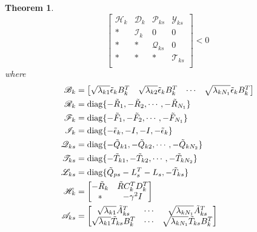\documentclass[conference]{IEEEtran}
\newtheorem{theorem}{Theorem}
\begin{document}
\begin{theorem}
	\begin{equation}\label{T3C3}
		\begin{bmatrix}
			\mathscr{H}_{k}&\mathscr{D}_{k}&\mathscr{P}_{ks}&\mathscr{Y}_{ks}\\
			*&\mathscr{I}_{k}&0&0\\
			*&*&\mathscr{Q}_{ks}&0\\
			*&*&*&\mathscr{T}_{ks}\\
		\end{bmatrix} <0
	\end{equation}
	where 
	\begin{equation}\notag
		\begin{split}
			\mathscr{B}_{k}&= \begin{bmatrix}
				\sqrt{\lambda_{k1}}\tilde{\epsilon}_{k}B^{T}_{k}&\sqrt{\lambda_{k2}}\tilde{\epsilon}_{k}B^{T}_{k}&\cdots&\sqrt{\lambda_{kN_{1}}}\tilde{\epsilon}_{k}B^{T}_{k}
			\end{bmatrix}\\
			\mathscr{R}_{k}&= \mathrm{diag}\{-\tilde{R}_{1}, -\tilde{R}_{2}, \cdots, -\tilde{R}_{N_{1}} \} \\
			\mathscr{F}_{k}&= \mathrm{diag}\{-\tilde{F}_{1}, -\tilde{F}_{2}, \cdots, -\tilde{F}_{N_{1}} \} \\	
			\mathscr{I}_{k} &= \mathrm{diag}\{-\tilde{\epsilon}_{k}, -I, -I, -\tilde{\epsilon}_{k} \}\\	
			\mathscr{Q}_{ks}&= \mathrm{diag}\{-\tilde{Q}_{k1}, -\tilde{Q}_{k2}, \cdots, -\tilde{Q}_{kN_{2}} \}\\
			\mathscr{T}_{ks}&= \mathrm{diag}\{-\tilde{T}_{k1}, -\tilde{T}_{k2}, \cdots, -\tilde{T}_{kN_{2}} \}\\
			\mathscr{L}_{ks}&= \mathrm{diag}\{\tilde{Q}_{ps}-L^{T}_{s}-L_{s},  -\tilde{T}_{ks} \}\\
			\mathscr{H}_{k} &= \begin{bmatrix}
				-\tilde{R}_{k} & \tilde{R}C^{T}_{k}D^{T}_{k}\\
				*& -\gamma^{2}I
			\end{bmatrix} \\
			\mathscr{A}_{ks} &=\begin{bmatrix}
				\sqrt{\lambda_{k1}} \tilde{A}^{T}_{ks}& \cdots&\sqrt{\lambda_{kN_{1}}} \tilde{A}^{T}_{ks}\\
				\sqrt{\lambda_{k1}}\tilde{T}_{ks}B^{T}_{k} &\cdots&\sqrt{\lambda_{kN_{1}}} \tilde{T}_{ks}B^{T}_{k}\\

\end{bmatrix}
\end{split}
\end{equation}
\end{theorem}
\end{document}
